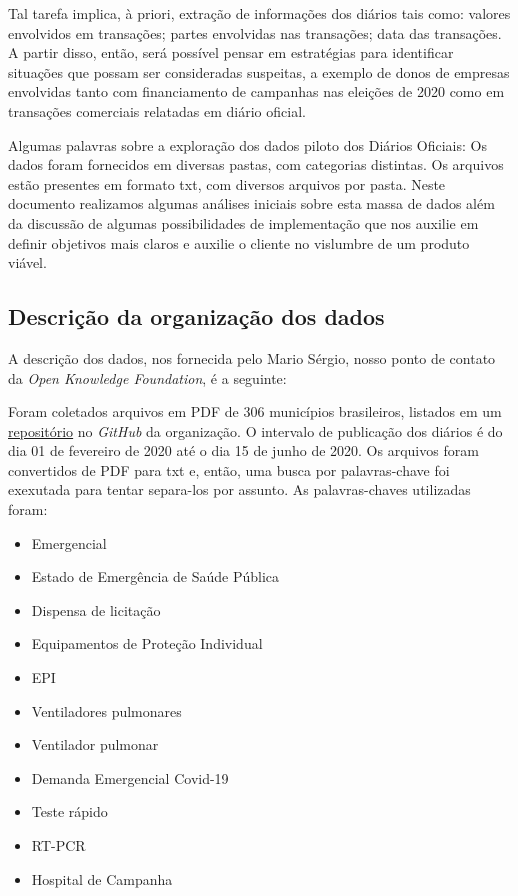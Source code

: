 \documentclass[10pt, a4paper]{article}
\begin{document}
Tal tarefa implica, à priori, extração de informações dos diários tais como: valores envolvidos em transações; partes envolvidas nas transações; data das transações. A partir disso, então, será possível pensar em estratégias para identificar situações que possam ser consideradas suspeitas, a exemplo de donos de empresas envolvidas tanto com financiamento de campanhas nas eleições de 2020 como em transações comerciais relatadas em diário oficial.

Algumas palavras sobre a exploração dos dados piloto dos Diários Oficiais: Os dados foram fornecidos em diversas pastas, com categorias distintas. Os arquivos estão presentes em formato txt, com diversos arquivos por pasta. Neste documento realizamos algumas análises iniciais sobre esta massa de dados além da discussão de algumas possibilidades de implementação que nos auxilie em definir objetivos mais claros e auxilie o cliente no vislumbre de um produto viável.

\subsection{Descrição da organização dos dados}

A descrição dos dados, nos fornecida pelo Mario Sérgio, nosso ponto de contato da \textit{Open Knowledge Foundation}, é a seguinte:

Foram coletados arquivos em PDF de 306 municípios brasileiros, listados em um \href{https://github.com/okfn-brasil/querido-diario/tree/main/processing/data_collection/gazette/spiders}{repositório} no \textit{GitHub} da organização.
O intervalo de publicação dos diários é do dia 01 de fevereiro de 2020 até o dia 15 de junho de 2020. Os arquivos foram convertidos de PDF para txt e, então, uma busca por palavras-chave foi exexutada para tentar separa-los por assunto. As palavras-chaves utilizadas foram:

\begin{itemize}
    \item Emergencial
    \item Estado de Emergência de Saúde Pública
    \item Dispensa de licitação
    \item Equipamentos de Proteção Individual
    \item EPI
    \item Ventiladores pulmonares
    \item Ventilador pulmonar
    \item Demanda Emergencial Covid-19
    \item Teste rápido
    \item RT-PCR
    \item Hospital de Campanha
\end{itemize}
\end{document}
